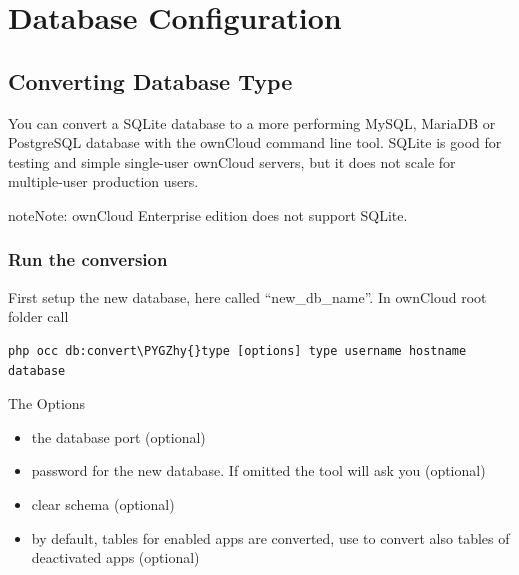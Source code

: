 \documentclass[letterpaper,10pt,english]{sphinxmanual}
\def\PYGZhy{\char`\-}
\begin{document}
\chapter{Database Configuration}
\label{configuration_database/index:database-configuration}\label{configuration_database/index::doc}

\section{Converting Database Type}
\label{configuration_database/db_conversion:converting-database-type}\label{configuration_database/db_conversion::doc}
You can convert a SQLite database to a more performing MySQL, MariaDB or
PostgreSQL database with the ownCloud command line tool. SQLite is good for
testing and simple single-user ownCloud servers, but it does not scale for
multiple-user production users.

\begin{notice}{note}{Note:}
ownCloud Enterprise edition does not support SQLite.
\end{notice}


\subsection{Run the conversion}
\label{configuration_database/db_conversion:run-the-conversion}
First setup the new database, here called ``new\_db\_name''.
In ownCloud root folder call

\begin{Verbatim}[commandchars=\\\{\}]
php occ db:convert\PYGZhy{}type [options] type username hostname database
\end{Verbatim}

The Options
\begin{itemize}
\item {} 
                       the database port (optional)

\item {} 
    password for the new database. If omitted the tool will ask you (optional)

\item {} 
                      clear schema (optional)

\item {} 
                          by default, tables for enabled apps are converted, use to convert also tables of deactivated apps (optional)

\end{itemize}
\end{document}
